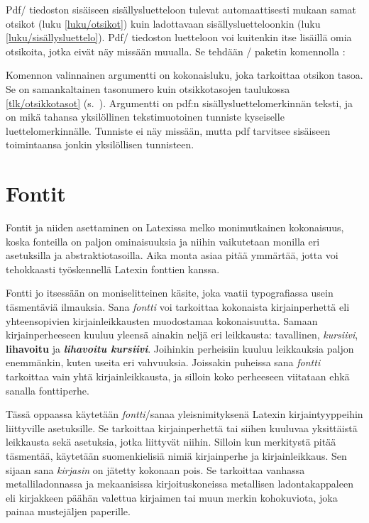 Pdf\-/ tiedoston sisäiseen sisällysluetteloon tulevat automaattisesti
mukaan samat otsikot (luku \ref{luku/otsikot}) kuin ladottavaan
sisällysluetteloonkin (luku \ref{luku/sisällysluettelo}). Pdf\-/
tiedoston luetteloon voi kuitenkin itse lisäillä omia otsikoita, jotka
eivät näy missään muualla. Se tehdään \-/ paketin
komennolla :

\begin{koodilohkosis}
\end{koodilohkosis}

\noindent
Komennon valinnainen argumentti  on kokonaisluku, joka
tarkoittaa otsikon tasoa. Se on samankaltainen tasonumero kuin
otsikkotasojen taulukossa \ref{tlk/otsikkotasot}
(s.~\pageref{tlk/otsikkotasot}). Argumentti  on pdf:n
sisällysluettelomerkinnän teksti, ja  on mikä tahansa
yksilöllinen tekstimuotoinen tunniste kyseiselle luettelomerkinnälle.
Tunniste ei näy missään, mutta pdf tarvitsee sisäiseen toimintaansa
jonkin yksilöllisen tunnisteen.

\section{Fontit}
\label{luku/kirjaintyypit}

Fontit ja niiden asettaminen on Latexissa melko monimutkainen
kokonaisuus, koska fonteilla on paljon ominaisuuksia ja niihin
vaikutetaan monilla eri asetuksilla ja abstraktiotasoilla. Aika monta
asiaa pitää ymmärtää, jotta voi tehokkaasti työskennellä Latexin
fonttien kanssa.

Fontti jo itsessään on moniselitteinen käsite, joka vaatii typografiassa
usein täsmentäviä ilmauksia. Sana \emph{fontti} voi tarkoittaa
kokonaista kirjainperhettä eli yhteensopivien kirjainleikkausten
muodostamaa kokonaisuutta. Samaan kirjainperheeseen kuuluu yleensä
ainakin neljä eri leikkausta: tavallinen, \textit{kursiivi},
\textbf{lihavoitu} ja \textbf{\textit{lihavoitu kursiivi}}. Joihinkin
perheisiin kuuluu leikkauksia paljon enemmänkin, kuten useita eri
vahvuuksia. Joissakin puheissa sana \emph{fontti} tarkoittaa vain yhtä
kirjainleikkausta, ja silloin koko perheeseen viitataan ehkä sanalla
fonttiperhe.

Tässä oppaassa käytetään \emph{fontti}\-/sanaa yleisnimityksenä Latexin
kirjaintyyppeihin liittyville asetuksille. Se tarkoittaa kirjainperhettä
tai siihen kuuluvaa yksittäistä leikkausta sekä asetuksia, jotka
liittyvät niihin. Silloin kun merkitystä pitää täsmentää, käytetään
suomenkielisiä nimiä kirjainperhe ja kirjainleikkaus. Sen sijaan sana
\emph{kirjasin} on jätetty kokonaan pois. Se tarkoittaa vanhassa
metalliladonnassa ja mekaanisissa kirjoituskoneissa metallisen
ladontakappaleen eli kirjakkeen päähän valettua kirjaimen tai muun
merkin kohokuviota, joka painaa mustejäljen paperille.

